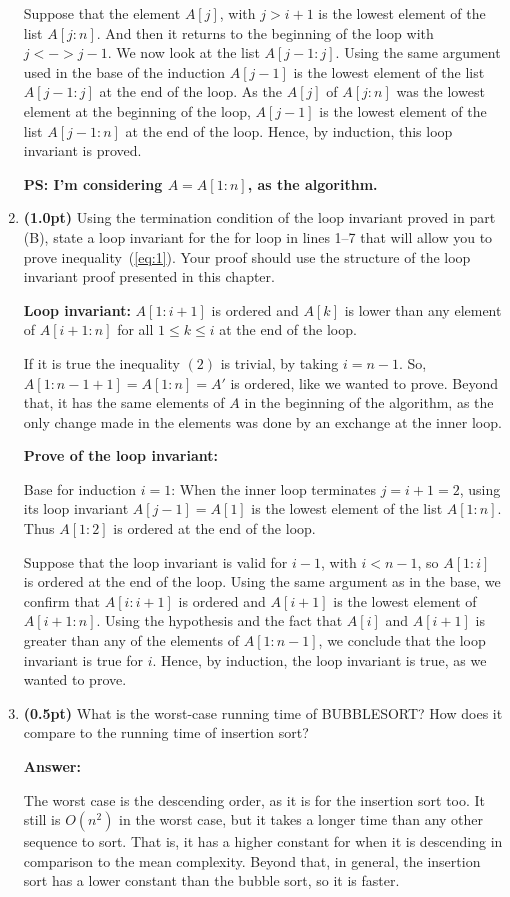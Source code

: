 \documentclass{article}
\begin{document}
\begin{enumerate}[label=\Alph*]
  
  Suppose that the element $A[j]$, with $j>i+1$ is the lowest element of the list $A[j:n]$. And then it returns to the beginning of the loop with $j <-> j-1$. We now look at the list $A[j-1:j]$. Using the same argument used in the base of the induction $A[j-1]$ is the lowest element of the list $A[j-1:j]$ at the end of the loop. As the $A[j]$ of $A[j:n]$ was the lowest element at the beginning of the loop, $A[j-1]$ is the lowest element of the list $A[j-1:n]$ at the end of the loop. Hence, by induction, this loop invariant is proved.
  

  \textbf{PS: I'm considering $A = A[1:n]$, as the algorithm.}


  \item \textbf{(1.0pt)} Using the termination condition of the loop invariant proved in part (B), state a loop invariant for the for loop in lines 1–7 that will allow you to prove inequality~(\ref{eq:1}). Your proof should use the structure of the loop invariant proof presented in this chapter.


  \textbf{Loop invariant:} $A[1:i+1]$ is ordered and $A[k]$ is lower than any element of $A[i+1:n]$ for all $1 \leq k \leq i$ at the end of the loop.
  
  If it is true the inequality $(2)$ is trivial, by taking $i=n-1$. So, $A[1:n-1+1] = A[1:n] = A'$ is ordered, like we wanted to prove. Beyond that, it has the same elements of $A$ in the beginning of the algorithm, as the only change made in the elements was done by an exchange at the inner loop.
  
  \textbf{Prove of the loop invariant:} 
  
  Base for induction $i=1$: When the inner loop terminates $j=i+1=2$, using its loop invariant $A[j-1]=A[1]$ is the lowest element of the list $A[1:n]$. Thus $A[1:2]$ is ordered at the end of the loop.
  
  Suppose that the loop invariant is valid for $i-1$, with $i < n-1$, so $A[1:i]$ is ordered at the end of the loop. Using the same argument as in the base, we confirm that $A[i:i+1]$ is ordered and $A[i+1]$ is the lowest element of $A[i+1:n]$. Using the hypothesis and the fact that $A[i]$ and $A[i+1]$ is greater than any of the elements of $A[1:n-1]$, we conclude that the loop invariant is true for $i$. Hence, by induction, the loop invariant is true, as we wanted to prove.


  \item \textbf{(0.5pt)} What is the worst-case running time of BUBBLESORT? How does it compare to the running time of insertion sort?
  
  \textbf{Answer:}
  
  The worst case is the descending order, as it is for the insertion sort too. It still is $O(n^2)$ in the worst case, but it takes a longer time than any other sequence to sort. That is, it has a higher constant for when it is descending in comparison to the mean complexity. Beyond that, in general, the insertion sort has a lower constant than the bubble sort, so it is faster.
  
  
\end{enumerate}
\end{document}
